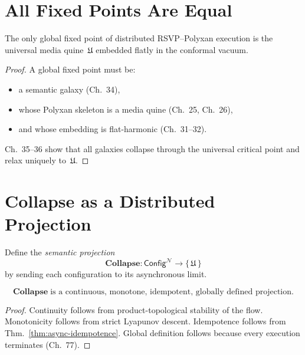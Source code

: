 \section{All Fixed Points Are Equal}

\begin{theorem}
\label{thm:unique-fixed-point}
The only global fixed point of distributed RSVP--Polyxan execution is
the universal media quine~$\mathfrak{U}$ embedded flatly in the conformal vacuum.
\end{theorem}

\begin{proof}
A global fixed point must be:
\begin{itemize}
\item a semantic galaxy (Ch.~34),
\item whose Polyxan skeleton is a media quine (Ch.~25, Ch.~26),
\item and whose embedding is flat-harmonic (Ch.~31--32).
\end{itemize}

Ch.~35--36 show that all galaxies collapse through the universal critical point
and relax uniquely to~$\mathfrak{U}$.
\end{proof}

\section{Collapse as a Distributed Projection}

\begin{definition}
Define the \emph{semantic projection}
\[
\mathbf{Collapse} :
  \mathsf{Config}^{\mathcal{N}}
  \longrightarrow
  \bigl\{\,\mathfrak{U}\,\bigr\}
\]
by sending each configuration to its asynchronous limit.
\end{definition}

\begin{theorem}
\[
\mathbf{Collapse}
\;\text{is a continuous, monotone, idempotent, globally defined projection.}
\]
\end{theorem}

\begin{proof}
Continuity follows from product-topological stability of the flow.
Monotonicity follows from strict Lyapunov descent.
Idempotence follows from Thm.~\ref{thm:async-idempotence}.
Global definition follows because every execution terminates
(Ch.~77).
\end{proof}

